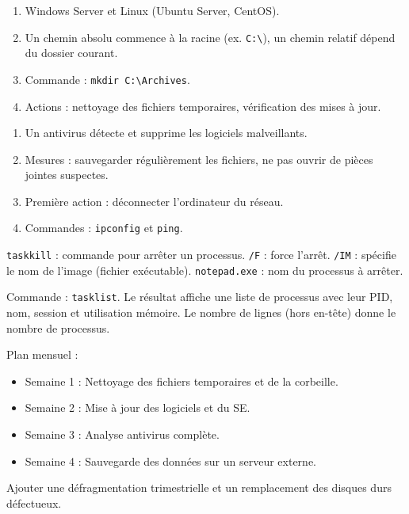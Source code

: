 \begin{enumerate}
    \item Windows Server et Linux (Ubuntu Server, CentOS).
    \item Un chemin absolu commence à la racine (ex. \texttt{C:\textbackslash}), un chemin relatif dépend du dossier courant.
    \item Commande : \texttt{mkdir C:\textbackslash Archives}.
    \item Actions : nettoyage des fichiers temporaires, vérification des mises à jour.
\end{enumerate}

\begin{enumerate}
    \item Un antivirus détecte et supprime les logiciels malveillants.
    \item Mesures : sauvegarder régulièrement les fichiers, ne pas ouvrir de pièces jointes suspectes.
    \item Première action : déconnecter l'ordinateur du réseau.
    \item Commandes : \texttt{ipconfig} et \texttt{ping}.
\end{enumerate}

\texttt{taskkill} : commande pour arrêter un processus. \texttt{/F} : force l'arrêt. \texttt{/IM} : spécifie le nom de l'image (fichier exécutable). \texttt{notepad.exe} : nom du processus à arrêter.

Commande : \texttt{tasklist}. Le résultat affiche une liste de processus avec leur PID, nom, session et utilisation mémoire. Le nombre de lignes (hors en-tête) donne le nombre de processus.

Plan mensuel :
\begin{itemize}
    \item Semaine 1 : Nettoyage des fichiers temporaires et de la corbeille.
    \item Semaine 2 : Mise à jour des logiciels et du SE.
    \item Semaine 3 : Analyse antivirus complète.
    \item Semaine 4 : Sauvegarde des données sur un serveur externe.
\end{itemize}
Ajouter une défragmentation trimestrielle et un remplacement des disques durs défectueux.
